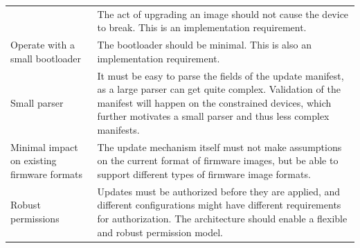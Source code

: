 \documentclass[0-thesis.tex]{subfiles}
\begin{document}
\begin{small}
\begin{longtable}[]{@{}ll@{}}
\begin{minipage}[t]{0.41\columnwidth}
        \end{minipage} & \begin{minipage}[t]{0.53\columnwidth}\raggedright\strut
        The act of upgrading an image should not cause the device to break. This
        is an implementation requirement.\strut
        \end{minipage}\tabularnewline
        \begin{minipage}[t]{0.41\columnwidth}\raggedright\strut
        Operate with a small bootloader\strut
        \end{minipage} & \begin{minipage}[t]{0.53\columnwidth}\raggedright\strut
        The bootloader should be minimal. This is also an implementation
        requirement.\strut
        \end{minipage}\tabularnewline
        \begin{minipage}[t]{0.41\columnwidth}\raggedright\strut
        Small parser\strut
        \end{minipage} & \begin{minipage}[t]{0.53\columnwidth}\raggedright\strut
        It must be easy to parse the fields of the update manifest, as a large
        parser can get quite complex. Validation of the manifest will happen on
        the constrained devices, which further motivates a small parser and thus
        less complex manifests.\strut
        \end{minipage}\tabularnewline
        \begin{minipage}[t]{0.41\columnwidth}\raggedright\strut
        Minimal impact on existing firmware formats\strut
        \end{minipage} & \begin{minipage}[t]{0.53\columnwidth}\raggedright\strut
        The update mechanism itself must not make assumptions on the current
        format of firmware images, but be able to support different types of
        firmware image formats.\strut
        \end{minipage}\tabularnewline
        \begin{minipage}[t]{0.41\columnwidth}\raggedright\strut
        Robust permissions\strut
        \end{minipage} & \begin{minipage}[t]{0.53\columnwidth}\raggedright\strut
        Updates must be authorized before they are applied, and different
        configurations might have different requirements for authorization. The
        architecture should enable a flexible and robust permission model.\strut

\end{minipage}
\end{longtable}
\end{small}
\end{document}

